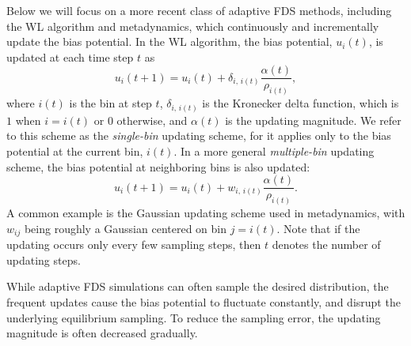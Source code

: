 \documentclass[preprint, superscriptaddress, floatfix]{revtex4-1}
\begin{document}
Below we will focus on a more recent class of adaptive FDS methods,
including the WL algorithm\cite{wang2001, wang2001pre}
and metadynamics\cite{huber1994, laio2002, *laio2008, *barducci2011, *sutto2012},
which
continuously and incrementally update the bias potential.
%
%
In the WL algorithm\cite{wang2001, wang2001pre},
the bias potential, $u_i(t)$, is updated
at each time step $t$ as
%
\begin{equation}
  u_i(t+1)
  =
  u_i(t)
  +
  \delta_{i, \, i(t)}
  \frac{ \alpha(t) } { \rho_{i(t)} }
  ,
\label{eq:wl_update}
\end{equation}
%
where $i(t)$ is the bin at step $t$,
$\delta_{i, \, i(t)}$ is the Kronecker delta function,
which is $1$ when $i = i(t)$ or $0$ otherwise,
and $\alpha(t)$ is the updating magnitude.
%
We refer to this scheme as
the \emph{single-bin} updating scheme,
for it applies only to the bias potential
at the current bin, $i(t)$.
%
In a more general
\emph{multiple-bin} updating scheme,
the bias potential at neighboring bins is also updated:
%
\begin{equation}
  u_i(t+1)
  =
  u_i(t)
  +
  w_{i, \, i(t)}
  \frac{ \alpha(t) }
       { \rho_{i(t)} }
  .
  \label{eq:mbin_update}
\end{equation}
%
A common example is the Gaussian updating scheme used in metadynamics,
with $w_{ij}$ being roughly a Gaussian centered on bin $j = i(t)$.
%
Note that if the updating occurs
only every few sampling steps,
then $t$ denotes the number of updating steps.




While adaptive FDS simulations
can often sample the desired distribution,
the frequent updates cause the bias potential to fluctuate constantly,
and disrupt the underlying equilibrium sampling.
%
To reduce the sampling error,
the updating magnitude is often decreased gradually.\cite{
  belardinelli2007, *belardinelli2007jcp, *belardinelli2008, *belardinelli2016,
  zhou2005, morozov2007, morozov2009, zhou2008, min2007,
  poulain2006, liang2007,
  crespo2010, *atchade2011, *fort2015}
\end{document}
